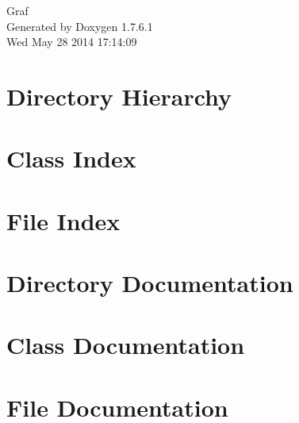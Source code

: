 \documentclass[a4paper]{book}
\begin{document}
\hypersetup{pageanchor=false,citecolor=blue}
\begin{titlepage}
\vspace*{7cm}
\begin{center}
{\Large \-Graf }\\
\vspace*{1cm}
{\large \-Generated by Doxygen 1.7.6.1}\\
\vspace*{0.5cm}
{\small Wed May 28 2014 17:14:09}\\
\end{center}
\end{titlepage}
\clearemptydoublepage
{}
\tableofcontents
\clearemptydoublepage
{}
\hypersetup{pageanchor=true,citecolor=blue}
\chapter{\-Directory \-Hierarchy}

\chapter{\-Class \-Index}

\chapter{\-File \-Index}

\chapter{\-Directory \-Documentation}

\chapter{\-Class \-Documentation}









\chapter{\-File \-Documentation}












\printindex
\end{document}
